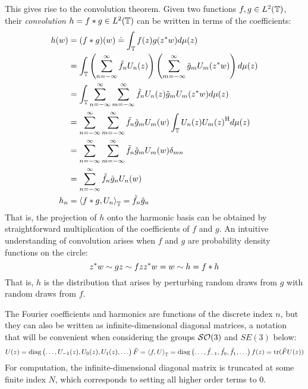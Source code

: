 \documentclass[../main.tex]{subfiles}
\begin{document}
\begin{refsection}
This gives rise to the convolution theorem.
Given two functions $f,g \in L^2(\mathbb{T})$, their \emph{convolution} $h = f * g \in L^2(\mathbb{T})$ can be written in terms of the coefficients:
\begingroup
\allowdisplaybreaks
\begin{align*}
h(w) &= (f * g)(w) \doteq \int_{\mathbb{T}} f(z) g({z}^* w) d\mu(z)\\
&= \int_{\mathbb{T}}
    \left(
      \sum_{n=-\infty}^\infty \tilde{f}_n U_n(z)
    \right)
    \left(
      \sum_{m=-\infty}^\infty \tilde{g}_m U_m({z}^* w)
    \right)
    d\mu(z)\\
&= \int_{\mathbb{T}}
   \sum_{n=-\infty}^\infty \sum_{m=-\infty}^\infty
    \tilde{f}_n U_n(z)
    \tilde{g}_m U_m({z}^* w)
    d\mu(z)\\
&= \sum_{n=-\infty}^\infty \sum_{m=-\infty}^\infty
    \tilde{f}_n \tilde{g}_m U_m(w)
    \int_{\mathbb{T}}
    U_n(z)
    {U_m(z)}^\mathrm{H}
    d\mu(z)\\
&= \sum_{n=-\infty}^\infty \sum_{m=-\infty}^\infty
    \tilde{f}_n \tilde{g}_m U_m(w)
    \delta_{mn}\\
&= \sum_{n=-\infty}^\infty \tilde{f}_n \tilde{g}_n U_n(w)\\
h_n &= \left\langle f * g, U_n \right\rangle_{\mathbb{T}} = \tilde{f}_n \tilde{g}_n
\end{align*}
\endgroup
That is, the projection of $h$ onto the harmonic basis can be obtained by straightforward multiplication of the coefficients of $f$ and $g$.
An intuitive understanding of convolution arises when $f$ and $g$ are probability density functions on the circle:
\[
{z}^* w \sim g\\
z \sim f\\
z {z}^* w = w \sim h = f * h
\]
That is, $h$ is the distribution that arises by perturbing random draws from $g$ with random draws from $f$.

The Fourier coefficients and harmonics are functions of the discrete index $n$, but they can also be written as infinite-dimensional diagonal matrices, a notation that will be convenient when considering the groups $\mathcal{SO}(3)$ and $SE(3)$ below:
\[
U(z) = \operatorname{diag} \begin{pmatrix}\ldots, U_{-1}(z), U_0(z), U_1(z), \ldots\end{pmatrix}\\
\tilde{F} = \left\langle f, U \right\rangle_{\mathbb{T}} = \operatorname{diag}\begin{pmatrix}\ldots, \tilde{f}_{-1}, \tilde{f}_0, \tilde{f}_1, \ldots\end{pmatrix}\\
f(z) = \operatorname{tr} (\tilde{F} U(z))
\]
For computation, the infinite-dimensional diagonal matrix is truncated at some finite index $N$, which corresponds to setting all higher order terms to 0.


\end{refsection}
\end{document}
